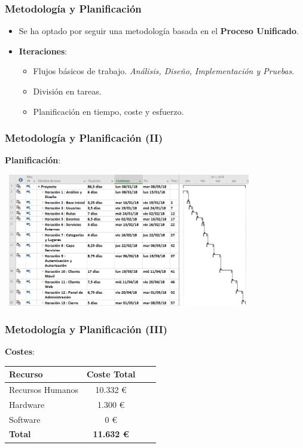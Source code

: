 \documentclass[usenames,dvipsnames]{beamer}
\begin{document}
\begin{frame}
\frametitle{Metodología y Planificación}
\begin{itemize}
\item Se ha optado por seguir una metodología basada en el \textbf{Proceso Unificado}.
\item \textbf{Iteraciones}:
\begin{itemize}
\item Flujos básicos de trabajo. \textit{Análisis, Diseño, Implementación y Pruebas}.
\item División en tareas.
\item Planificación en tiempo, coste y esfuerzo.
\end{itemize}
\end{itemize}
\end{frame}


\begin{frame}
\frametitle{Metodología y Planificación (II)}
\textbf{Planificación}:


\vspace{0.5cm}
\centering
\includegraphics[width=11cm, height=5.8cm]{./img/gantt.png}
\end{frame}


\begin{frame}
\frametitle{Metodología y Planificación (III)}
\textbf{Costes}:
\begin{table}[H]
\centering
\begin{tabular}{|l|c|c|c|}
\hline
\textbf{Recurso} & \textbf{Coste Total} \\ \hline
Recursos Humanos &  10.332 € \\ \hline
Hardware & 1.300 €  \\ \hline
Software & 0 €  \\ \hline
\textbf{Total} & \textbf{11.632 €} \\ \hline
\end{tabular}
\end{table}
\end{frame}
\end{document}
